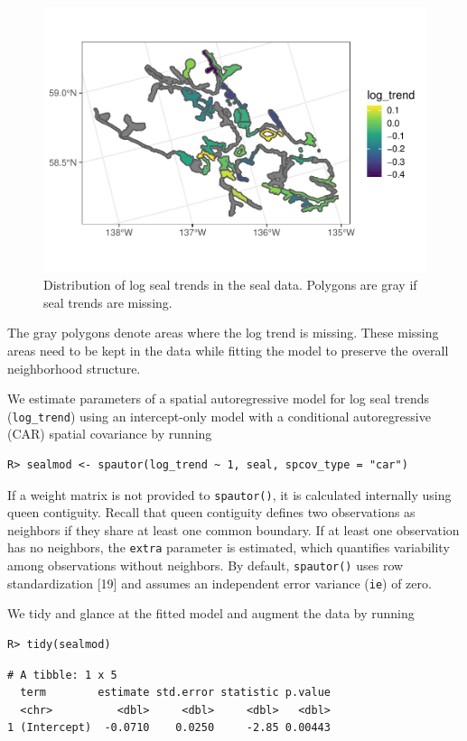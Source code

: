 \documentclass[10pt,letterpaper]{article}
\begin{document}
\begin{figure}

{\centering \includegraphics[width=0.65\linewidth]{preprint_files/figure-latex/log_trend-1} 

}

\caption{Distribution of log seal trends in the seal data. Polygons are gray if seal trends are missing.}\label{fig:log_trend}
\end{figure}

The gray polygons denote areas where the log trend is missing. These
missing areas need to be kept in the data while fitting the model to
preserve the overall neighborhood structure.

We estimate parameters of a spatial autoregressive model for log seal
trends (\texttt{log\_trend}) using an intercept-only model with a
conditional autoregressive (CAR) spatial covariance by running

\begin{verbatim}
R> sealmod <- spautor(log_trend ~ 1, seal, spcov_type = "car")
\end{verbatim}

If a weight matrix is not provided to \texttt{spautor()}, it is
calculated internally using queen contiguity. Recall that queen
contiguity defines two observations as neighbors if they share at least
one common boundary. If at least one observation has no neighbors, the
\texttt{extra} parameter is estimated, which quantifies variability
among observations without neighbors. By default, \texttt{spautor()}
uses row standardization {[}19{]} and assumes an independent error
variance (\texttt{ie}) of zero.

We tidy and glance at the fitted model and augment the data by running

\begin{verbatim}
R> tidy(sealmod)
\end{verbatim}

\begin{verbatim}
# A tibble: 1 x 5
  term        estimate std.error statistic p.value
  <chr>          <dbl>     <dbl>     <dbl>   <dbl>
1 (Intercept)  -0.0710    0.0250     -2.85 0.00443
\end{verbatim}
\end{document}
